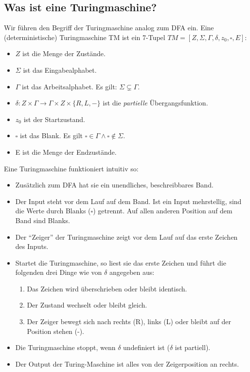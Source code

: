 \subsection{Was ist eine Turingmaschine?}

Wir führen den Begriff der Turingmaschine analog zum DFA ein.
Eine (deterministische) Turingmaschine TM ist ein 7-Tupel
$TM = [Z, \Sigma, \Gamma, \delta, z_0, \square, E]$:
\begin{itemize}
    \item $Z$ ist die Menge der Zustände.
    \item $\Sigma$ ist das Eingabealphabet.
    \item $\Gamma$ ist das Arbeitsalphabet. Es gilt: $\Sigma \subsetneq \Gamma$.
    \item $\delta: Z \times \Gamma \rightarrow \Gamma \times Z \times \{R,L,-\}$
        ist die \emph{partielle} Übergangsfunktion.
    \item $z_0$ ist der Startzustand.
    \item $\square$ ist das Blank.
        Es gilt $\square \in \Gamma \wedge \square \notin \Sigma$.
    \item E ist die Menge der Endzustände.
\end{itemize}

\noindent
Eine Turingmaschine funktioniert intuitiv so:
\begin{itemize}
    \item Zusätzlich zum DFA hat sie ein unendliches, beschreibbares Band.
    \item Der Input steht vor dem Lauf auf dem Band.
        Ist ein Input mehrstellig, sind die Werte durch Blanks ($\square$) getrennt.
        Auf allen anderen Position auf dem Band sind Blanks.
    \item Der ``Zeiger'' der Turingmaschine zeigt vor dem Lauf auf das erste Zeichen des Inputs.
    \item Startet die Turingmaschine,
        so liest sie das erste Zeichen
        und führt die folgenden drei Dinge wie von $\delta$ angegeben aus:
        \begin{enumerate}
            \item Das Zeichen wird überschrieben oder bleibt identisch.
            \item Der Zustand wechselt oder bleibt gleich.
            \item Der Zeiger bewegt sich nach
                rechts (R),
                links (L)
                oder bleibt auf der Position stehen (-).
        \end{enumerate}
    \item Die Turingmaschine stoppt,
        wenn $\delta$ undefiniert ist ($\delta$ ist partiell).
    \item Der Output der Turing-Maschine ist alles von der Zeigerposition an rechts.
\end{itemize}

